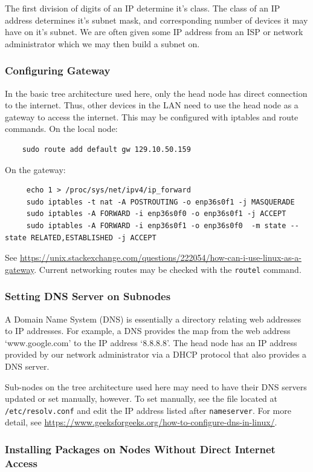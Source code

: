 \documentclass[]{article}
\begin{document}
The first division of digits of an IP determine it's class. The class of an IP address determines it's subnet mask, and corresponding number of devices it may have on it's subnet. We are often given some IP address from an ISP or network administrator which we may then build a subnet on.

\subsubsection{Configuring Gateway}
In the basic tree architecture used here, only the head node has direct connection to the internet. Thus, other devices in the LAN need to use the head node as a gateway to access the internet. This may be configured with iptables and route commands. 
On the local node:
\begin{verbatim}
	sudo route add default gw 129.10.50.159
\end{verbatim}
On the gateway:
\begin{verbatim}
	 echo 1 > /proc/sys/net/ipv4/ip_forward
	 sudo iptables -t nat -A POSTROUTING -o enp36s0f1 -j MASQUERADE
	 sudo iptables -A FORWARD -i enp36s0f0 -o enp36s0f1 -j ACCEPT
	 sudo iptables -A FORWARD -i enp36s0f1 -o enp36s0f0  -m state --state RELATED,ESTABLISHED -j ACCEPT
\end{verbatim}
See \url{https://unix.stackexchange.com/questions/222054/how-can-i-use-linux-as-a-gateway}.
Current networking routes may be checked with the \verb|routel| command.

\subsubsection{Setting DNS Server on Subnodes}
A Domain Name System (DNS) is essentially a directory relating web addresses to IP addresses. For example, a DNS provides the map from the web address `www.google.com' to the IP address `8.8.8.8'. The head node has an IP address provided by our network administrator via a DHCP protocol that also provides a DNS server. 

Sub-nodes on the tree architecture used here may need to have their DNS servers updated or set manually, however. To set manually, see the file located at \verb|/etc/resolv.conf| and edit the IP address listed after \verb|nameserver|.
For more detail, see \url{https://www.geeksforgeeks.org/how-to-configure-dns-in-linux/}.

\subsubsection{Installing Packages on Nodes Without Direct Internet Access}
\end{document}
